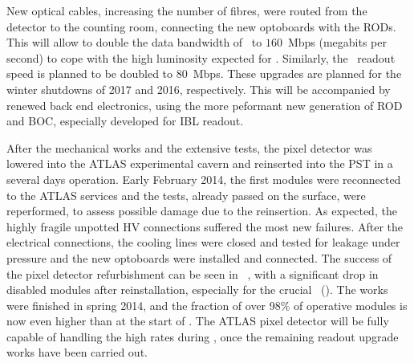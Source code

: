 %
New optical cables, increasing the number of fibres, were routed from the detector to the counting room, connecting the new optoboards with the \glspl{ROD}. 
%
This will allow to double the data bandwidth of \layerone\ to $160$~Mbps (megabits per second) to cope with the high luminosity expected for \RunTwo. Similarly, the \layertwo\ readout speed is planned to be doubled to $80$~Mbps. These upgrades are planned for the winter shutdowns of 2017 and 2016, respectively.
%
This will be accompanied by renewed back end electronics, using the more peformant new generation of \gls{ROD} and \gls{BOC}, especially developed for \gls{IBL} readout. 




After the mechanical works and the extensive tests, the pixel detector was lowered into the \gls{ATLAS} experimental cavern and reinserted into the \gls{PST} in a several days operation. Early February 2014, the first modules were reconnected to the \gls{ATLAS} services and the tests, already passed on the surface, were reperformed, to assess possible damage due to the reinsertion. As expected, the highly fragile unpotted \gls{HV} connections suffered the most new failures. After the electrical connections, the cooling lines were closed and tested for leakage under pressure and the new optoboards were installed and connected. The success of the pixel detector refurbishment can be seen in \fig~, with a significant drop in disabled modules after reinstallation, especially for the crucial \blayer\ (\layerzero). 
%
The works were finished in spring 2014, and the fraction of over 98\% of operative modules is now even higher than at the start of \RunOne. 
%
The \gls{ATLAS} pixel detector will be fully capable of handling the high rates during \RunTwo, once the remaining readout upgrade works have been carried out. 
%
